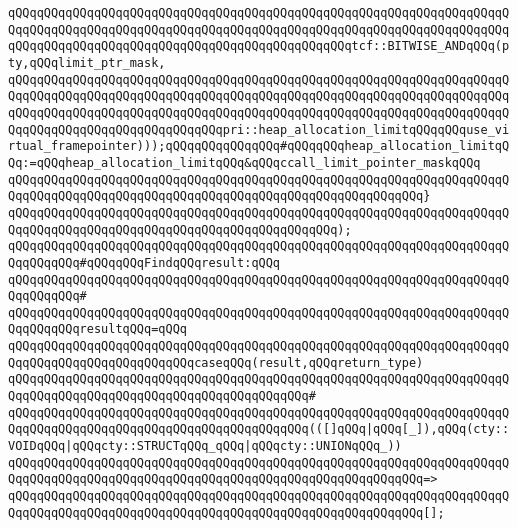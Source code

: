 \verb|qQQqqQQqqQQqqQQqqQQqqQQqqQQqqQQqqQQqqQQqqQQqqQQqqQQqqQQqqQQqqQQqqQQqqQQqqQQqqQQqqQQqqQQqqQQqqQQqqQQqqQQqqQQqqQQqqQQqqQQqqQQqqQQqqQQqqQQqqQQqqQQqqQQqqQQqqQQqqQQqqQQqqQQqqQQqqQQqqQQqqQQqqQQqtcf::BITWISE_ANDqQQq(pty,qQQqlimit_ptr_mask,|\newline
\verb|qQQqqQQqqQQqqQQqqQQqqQQqqQQqqQQqqQQqqQQqqQQqqQQqqQQqqQQqqQQqqQQqqQQqqQQqqQQqqQQqqQQqqQQqqQQqqQQqqQQqqQQqqQQqqQQqqQQqqQQqqQQqqQQqqQQqqQQqqQQqqQQqqQQqqQQqqQQqqQQqqQQqqQQqqQQqqQQqqQQqqQQqqQQqqQQqqQQqqQQqqQQqqQQqqQQqqQQqqQQqqQQqqQQqqQQqqQQqqQQqpri::heap_allocation_limitqQQqqQQquse_virtual_framepointer)));qQQqqQQqqQQqqQQq#qQQqqQQqheap_allocation_limitqQQq:=qQQqheap_allocation_limitqQQq&qQQqccall_limit_pointer_maskqQQq|\newline
\verb|qQQqqQQqqQQqqQQqqQQqqQQqqQQqqQQqqQQqqQQqqQQqqQQqqQQqqQQqqQQqqQQqqQQqqQQqqQQqqQQqqQQqqQQqqQQqqQQqqQQqqQQqqQQqqQQqqQQqqQQqqQQqqQQq}|\newline
\verb|qQQqqQQqqQQqqQQqqQQqqQQqqQQqqQQqqQQqqQQqqQQqqQQqqQQqqQQqqQQqqQQqqQQqqQQqqQQqqQQqqQQqqQQqqQQqqQQqqQQqqQQqqQQqqQQqqQQq);|\newline
\newline
\verb|qQQqqQQqqQQqqQQqqQQqqQQqqQQqqQQqqQQqqQQqqQQqqQQqqQQqqQQqqQQqqQQqqQQqqQQqqQQqqQQq#qQQqqQQqFindqQQqresult:qQQq|\newline
\verb|qQQqqQQqqQQqqQQqqQQqqQQqqQQqqQQqqQQqqQQqqQQqqQQqqQQqqQQqqQQqqQQqqQQqqQQqqQQqqQQq#|\newline
\verb|qQQqqQQqqQQqqQQqqQQqqQQqqQQqqQQqqQQqqQQqqQQqqQQqqQQqqQQqqQQqqQQqqQQqqQQqqQQqqQQqresultqQQq=qQQq|\newline
\verb|qQQqqQQqqQQqqQQqqQQqqQQqqQQqqQQqqQQqqQQqqQQqqQQqqQQqqQQqqQQqqQQqqQQqqQQqqQQqqQQqqQQqqQQqqQQqqQQqcaseqQQq(result,qQQqreturn_type)|\newline
\verb|qQQqqQQqqQQqqQQqqQQqqQQqqQQqqQQqqQQqqQQqqQQqqQQqqQQqqQQqqQQqqQQqqQQqqQQqqQQqqQQqqQQqqQQqqQQqqQQqqQQqqQQqqQQqqQQq#|\newline
\verb|qQQqqQQqqQQqqQQqqQQqqQQqqQQqqQQqqQQqqQQqqQQqqQQqqQQqqQQqqQQqqQQqqQQqqQQqqQQqqQQqqQQqqQQqqQQqqQQqqQQqqQQqqQQqqQQq(([]qQQq|\verb#|qQQq[_]),qQQq(cty::VOIDqQQq|qQQqcty::STRUCTqQQq_qQQq|qQQqcty::UNIONqQQq_))#\newline
\verb|qQQqqQQqqQQqqQQqqQQqqQQqqQQqqQQqqQQqqQQqqQQqqQQqqQQqqQQqqQQqqQQqqQQqqQQqqQQqqQQqqQQqqQQqqQQqqQQqqQQqqQQqqQQqqQQqqQQqqQQqqQQqqQQq=>|\newline
\verb|qQQqqQQqqQQqqQQqqQQqqQQqqQQqqQQqqQQqqQQqqQQqqQQqqQQqqQQqqQQqqQQqqQQqqQQqqQQqqQQqqQQqqQQqqQQqqQQqqQQqqQQqqQQqqQQqqQQqqQQqqQQqqQQq[];|\newline
